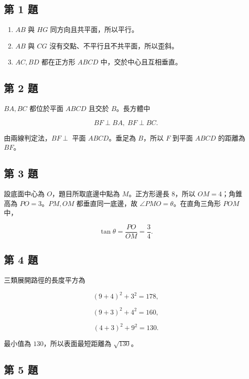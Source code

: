 \documentclass[11pt,a4paper]{article}
\providecommand{\tightlist}{%
  \setlength{\itemsep}{0pt}\setlength{\parskip}{0pt}}
\begin{document}
\subsection{第 1 題}\label{ux7b2c-1-ux984c}

\begin{enumerate}
\def\labelenumi{\arabic{enumi}.}
\tightlist
\item
  \(AB\) 與 \(HG\) 同方向且共平面，所以平行。
\item
  \(AB\) 與 \(CG\) 沒有交點、不平行且不共平面，所以歪斜。
\item
  \(AC,BD\) 都在正方形 \(ABCD\) 中，交於中心且互相垂直。
\end{enumerate}

\subsection{第 2 題}\label{ux7b2c-2-ux984c}

\(BA,BC\) 都位於平面 \(ABCD\) 且交於 \(B\)。長方體中

\[
BF\perp BA,\; BF\perp BC.
\]

由兩線判定法，\(BF\perp\) 平面 \(ABCD\)。垂足為 \(B\)，所以 \(F\) 到平面 \(ABCD\) 的距離為 \(BF\)。

\subsection{第 3 題}\label{ux7b2c-3-ux984c}

設底面中心為 \(O\)，題目所取底邊中點為 \(M\)。正方形邊長 \(8\)，所以 \(OM=4\)；角錐高為 \(PO=3\)。\(PM,OM\) 都垂直同一底邊，故 \(\angle PMO=\theta\)。在直角三角形 \(POM\) 中，

\[
\tan\theta=\frac{PO}{OM}=\frac34.
\]

\subsection{第 4 題}\label{ux7b2c-4-ux984c}

三類展開路徑的長度平方為

\[
(9+4)^2+3^2=178,
\]

\[
(9+3)^2+4^2=160,
\]

\[
(4+3)^2+9^2=130.
\]

最小值為 \(130\)，所以表面最短距離為 \(\sqrt{130}\)。

\subsection{第 5 題}\label{ux7b2c-5-ux984c}
\end{document}
